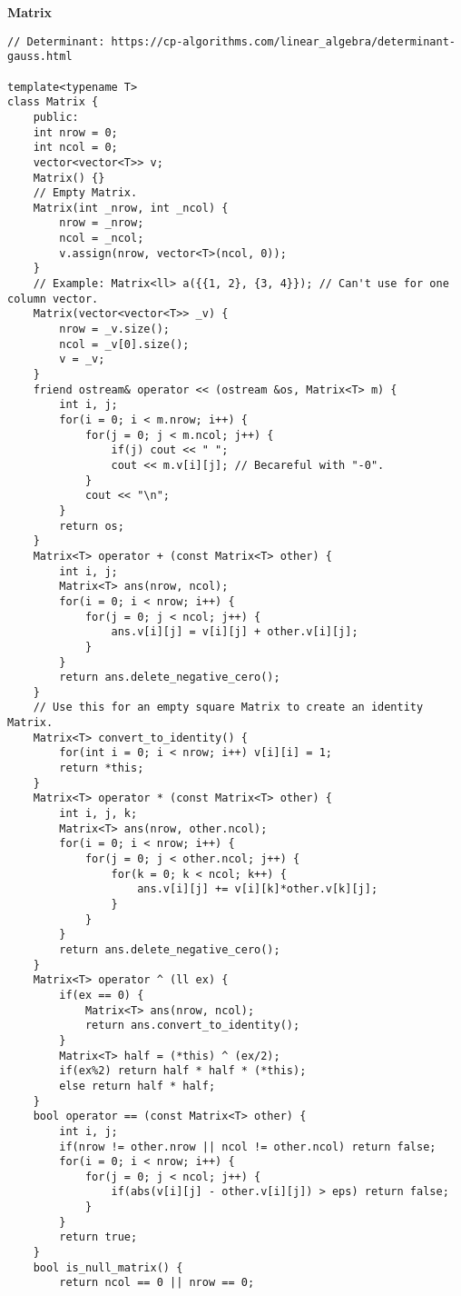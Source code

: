 \documentclass[a4paper,10pt]{article}
\newcommand{\titleAlg}[1]{\vspace{-10pt}
\begin{center}\textbf{#1}\end{center} \vspace{-10pt}}
\begin{document}
\titleAlg{Matrix}
\begin{multicols}{2}
\begin{verbatim}
// Determinant: https://cp-algorithms.com/linear_algebra/determinant-gauss.html

template<typename T>
class Matrix {
    public:
    int nrow = 0;
    int ncol = 0;
    vector<vector<T>> v;
    Matrix() {}
    // Empty Matrix.
    Matrix(int _nrow, int _ncol) {
        nrow = _nrow;
        ncol = _ncol;
        v.assign(nrow, vector<T>(ncol, 0));
    }
    // Example: Matrix<ll> a({{1, 2}, {3, 4}}); // Can't use for one column vector.
    Matrix(vector<vector<T>> _v) {
        nrow = _v.size();
        ncol = _v[0].size();
        v = _v;
    }
    friend ostream& operator << (ostream &os, Matrix<T> m) {
        int i, j;
        for(i = 0; i < m.nrow; i++) {
            for(j = 0; j < m.ncol; j++) {
                if(j) cout << " ";
                cout << m.v[i][j]; // Becareful with "-0".
            }
            cout << "\n";
        }
        return os;
    }
    Matrix<T> operator + (const Matrix<T> other) {
        int i, j;
        Matrix<T> ans(nrow, ncol);
        for(i = 0; i < nrow; i++) {
            for(j = 0; j < ncol; j++) {
                ans.v[i][j] = v[i][j] + other.v[i][j];
            }
        }
        return ans.delete_negative_cero();
    }
    // Use this for an empty square Matrix to create an identity Matrix.
    Matrix<T> convert_to_identity() {
        for(int i = 0; i < nrow; i++) v[i][i] = 1;
        return *this;
    }
    Matrix<T> operator * (const Matrix<T> other) {
        int i, j, k;
        Matrix<T> ans(nrow, other.ncol);
        for(i = 0; i < nrow; i++) {
            for(j = 0; j < other.ncol; j++) {
                for(k = 0; k < ncol; k++) {
                    ans.v[i][j] += v[i][k]*other.v[k][j];
                }
            }
        }
        return ans.delete_negative_cero();
    }
    Matrix<T> operator ^ (ll ex) {
        if(ex == 0) {
            Matrix<T> ans(nrow, ncol);
            return ans.convert_to_identity();
        }
        Matrix<T> half = (*this) ^ (ex/2);
        if(ex%2) return half * half * (*this);
        else return half * half;
    }
    bool operator == (const Matrix<T> other) {
        int i, j;
        if(nrow != other.nrow || ncol != other.ncol) return false;
        for(i = 0; i < nrow; i++) {
            for(j = 0; j < ncol; j++) {
                if(abs(v[i][j] - other.v[i][j]) > eps) return false;
            }
        }
        return true;
    }
    bool is_null_matrix() {
        return ncol == 0 || nrow == 0;

\end{verbatim}
\end{multicols}
\end{document}
